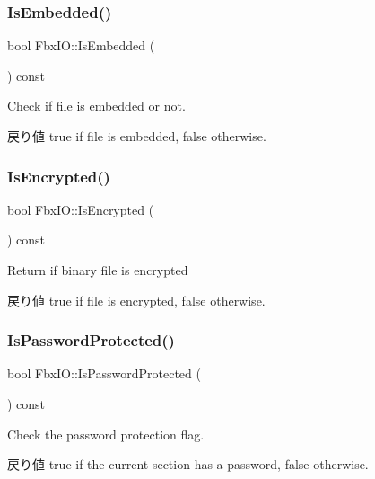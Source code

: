 \subsubsection{\texorpdfstring{Is\+Embedded()}{IsEmbedded()}}
{\footnotesize\ttfamily bool Fbx\+I\+O\+::\+Is\+Embedded (\begin{DoxyParamCaption}{ }\end{DoxyParamCaption}) const}

Check if file is embedded or not. \begin{DoxyReturn}{戻り値}
{\ttfamily true} if file is embedded, false otherwise. 
\end{DoxyReturn}
\mbox{\label{class_fbx_i_o_ade6fc2ff55191b403423001046b951cb}} 
\subsubsection{\texorpdfstring{Is\+Encrypted()}{IsEncrypted()}}
{\footnotesize\ttfamily bool Fbx\+I\+O\+::\+Is\+Encrypted (\begin{DoxyParamCaption}{ }\end{DoxyParamCaption}) const}

Return if binary file is encrypted \begin{DoxyReturn}{戻り値}
{\ttfamily true} if file is encrypted, false otherwise. 
\end{DoxyReturn}
\mbox{\label{class_fbx_i_o_a04c60fa24b0b75d64b70e98db565d3ce}} 
\subsubsection{\texorpdfstring{Is\+Password\+Protected()}{IsPasswordProtected()}}
{\footnotesize\ttfamily bool Fbx\+I\+O\+::\+Is\+Password\+Protected (\begin{DoxyParamCaption}{ }\end{DoxyParamCaption}) const}

Check the password protection flag. \begin{DoxyReturn}{戻り値}
{\ttfamily true} if the current section has a password, {\ttfamily false} otherwise. 
\end{DoxyReturn}
\mbox{\label{class_fbx_i_o_a622f4b331475288b8e25c7e3dbb37b02}} 
